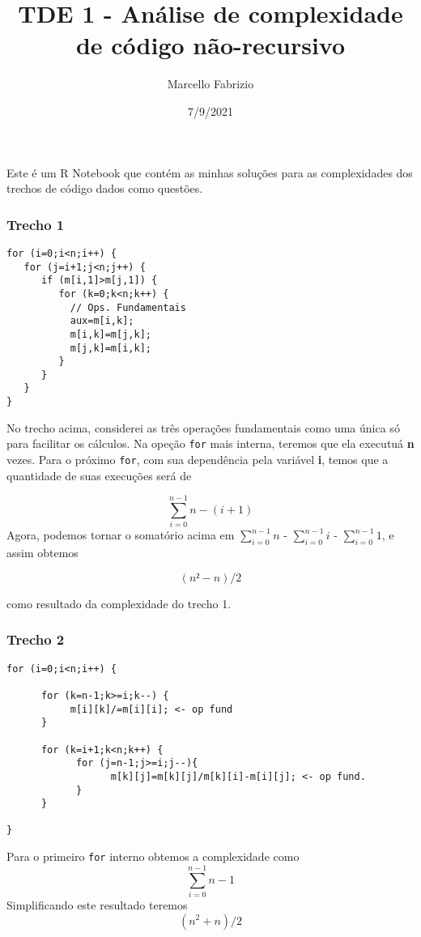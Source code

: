 \documentclass[
]{article}
\title{TDE 1 - Análise de complexidade de código não-recursivo}
\author{Marcello Fabrizio}
\date{7/9/2021}
\begin{document}
\maketitle

Este é um R Notebook que contém as minhas soluções para as complexidades
dos trechos de código dados como questões.

\hypertarget{trecho-1}{%
\subsubsection{Trecho 1}\label{trecho-1}}

\begin{verbatim}
for (i=0;i<n;i++) {
   for (j=i+1;j<n;j++) {
      if (m[i,1]>m[j,1]) {
         for (k=0;k<n;k++) {
           // Ops. Fundamentais
           aux=m[i,k];
           m[i,k]=m[j,k];
           m[j,k]=m[i,k];
         }
      }
   }
}
\end{verbatim}

No trecho acima, considerei as três operações fundamentais como uma
única só para facilitar os cálculos. Na opeção \texttt{for} mais
interna, teremos que ela executuá \textbf{n} vezes. Para o próximo
\texttt{for}, com sua dependência pela variável \textbf{i}, temos que a
quantidade de suas execuções será de

\[\sum_{i=0}^{n-1} n-(i+1)\] Agora, podemos tornar o somatório acima em
\(\sum_{i=0}^{n-1} n\) - \(\sum_{i=0}^{n-1} i\) -
\(\sum_{i=0}^{n-1} 1\), e assim obtemos

\[(n²-n)/2\]

como resultado da complexidade do trecho 1.

\hypertarget{trecho-2}{%
\subsubsection{Trecho 2}\label{trecho-2}}

\begin{verbatim}
for (i=0;i<n;i++) {

      for (k=n-1;k>=i;k--) {
           m[i][k]/=m[i][i]; <- op fund
      }
      
      for (k=i+1;k<n;k++) {
            for (j=n-1;j>=i;j--){
                  m[k][j]=m[k][j]/m[k][i]-m[i][j]; <- op fund.
            }
      }

}
\end{verbatim}

Para o primeiro \texttt{for} interno obtemos a complexidade como
\[\sum_{i=0}^{n-1} n-1\] Simplificando este resultado teremos
\[(n^2 + n)/2\]
\end{document}
